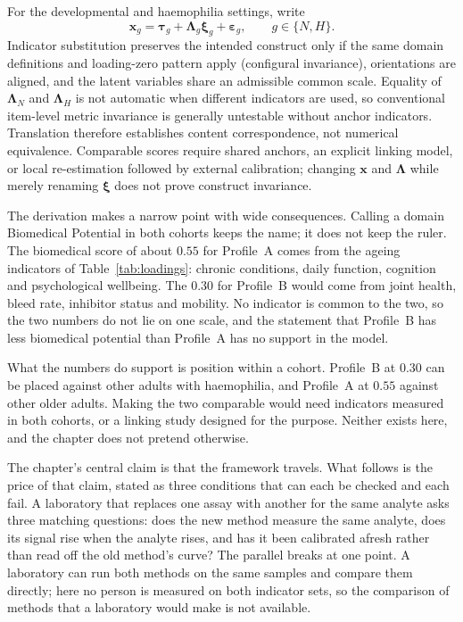 \begin{derivation}
\label{der:indicator_substitution}
For the developmental and haemophilia settings, write
\[
 \mathbf x_g=\boldsymbol\tau_g+\boldsymbol\Lambda_g\boldsymbol\xi_g+
 \boldsymbol\varepsilon_g,
 \qquad g\in\{N,H\}.
\]
Indicator substitution preserves the intended construct only if the same domain
definitions and loading-zero pattern apply (configural \citep{putnick_bornstein_2016} invariance), orientations
are aligned, and the latent variables share an admissible common scale. Equality
of $\boldsymbol\Lambda_N$ and $\boldsymbol\Lambda_H$ is not automatic when
different indicators are used, so conventional item-level metric invariance is
generally untestable without anchor indicators. Translation therefore establishes
content correspondence, not numerical equivalence. Comparable scores require
shared anchors, an explicit linking model, or local re-estimation followed by
external calibration; changing $\mathbf x$ and $\boldsymbol\Lambda$ while merely
renaming $\boldsymbol\xi$ does not prove construct invariance.
\end{derivation}

\begin{reading}
The derivation makes a narrow point with wide consequences. Calling a domain
Biomedical Potential in both cohorts keeps the name; it does not keep the
ruler. The biomedical score of about $0.55$ for Profile~A comes from the
ageing indicators of Table~\ref{tab:loadings}: chronic conditions, daily
function, cognition and psychological wellbeing. The $0.30$ for
Profile~B would come from joint health, bleed rate, inhibitor status and
mobility. No indicator is common to the two, so the two numbers do not lie on
one scale, and the statement that Profile~B has less biomedical potential than
Profile~A has no support in the model.

What the numbers do support is position within a cohort. Profile~B at $0.30$
can be placed against other adults with haemophilia, and Profile~A at $0.55$
against other older adults. Making the two comparable would need indicators measured in both
cohorts, or a linking study designed for the purpose. Neither exists here, and
the chapter does not pretend otherwise.
\end{reading}

The chapter's central claim is that the framework travels. What follows is the
price of that claim, stated as three conditions that can each be checked and
each fail. A laboratory that replaces one assay with another for the same
analyte asks three matching questions: does the new method measure the same
analyte, does its signal rise when the analyte rises, and has it been
calibrated afresh rather than read off the old method's curve? The parallel
breaks at one point. A laboratory can run both methods on the same samples and
compare them directly; here no person is measured on both indicator sets, so
the comparison of methods that a laboratory would make is not available.

